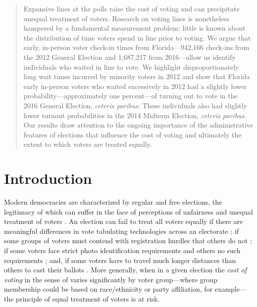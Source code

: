 \documentclass[12pt,titlepage]{article}
\begin{document}


\begin{abstract}
  \noindent 
  Expansive lines at the polls raise the cost of voting and can
  precipitate unequal treatment of voters. \mbox{Research} on voting lines is
  nonetheless hampered by a fundamental measurement problem: little is
  known about the distribution of time voters spend in line
  prior to voting. We  argue that early, in-person voter check-in times from
  Florida---942,166 check-ins from the 2012 General Election and
  1,687,217 from 2016---allow us identify individuals who waited in
  line to vote. We
  highlight disproportionately long wait times incurred by minority
  voters in 2012 and show that Florida early in-person voters who
  waited excessively in 2012 had a slightly lower
  probability---approximately one percent---of turning out to vote in
  the 2016 General Election, \emph{ceteris paribus}.  These
  individuals also had slightly lower turnout probabilities in the
  2014 Midterm Election, \emph{ceteris paribus}.  Our results draw
  attention to the ongoing importance of the administrative features
  of elections that influence the cost of voting and ultimately the
  extent to which voters are treated equally.
\end{abstract}



\newpage
\section*{Introduction}

Modern democracies are characterized by regular and free elections,
the legitimacy of which can suffer in the face of perceptions of
unfairness and unequal treatment of voters
\citep{norris2014electoral}. An election can fail to treat all voters
equally if there are meaningful differences in vote tabulating
technologies across an electorate \citep{kimballkropf:tech}; if some
groups of voters must contend with registration hurdles that others do
not \citep{ansolhersh:registration}; if some voters face strict photo
identification requirements and others no such requirements
\citep{benteleetal:newjimcrow}; and, if some voters have to travel
much longer distances than others to cast their ballots
\citep{dyckgimpel:distance}. More generally, when in a given election
the \emph{cost of voting} in the sense of \cite{downs:econtheory}
varies significantly by voter group---where group membership could be
based on race/ethnicity or party affiliation, for example---the
principle of equal treatment of voters is at risk.
\end{document}
